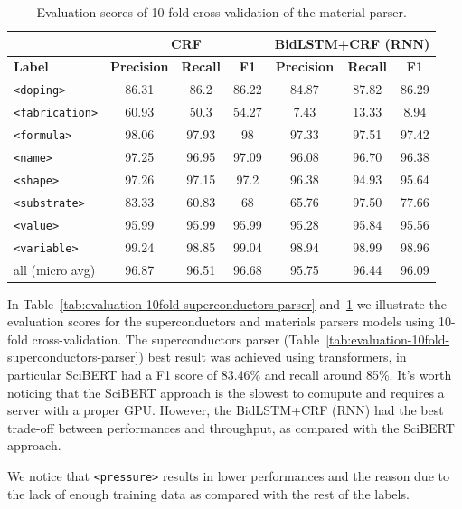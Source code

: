 \documentclass{article}
\begin{document}
\begin{table}[ht]
\centering
\begin{tabular}{l|ccc|ccc}
& \multicolumn{3}{c}{\textbf{CRF}} & \multicolumn{3}{c}{\textbf{BidLSTM+CRF} (RNN)}\\ 
\hline \textbf{Label} & \textbf{Precision} & \textbf{Recall} & \textbf{F1} & \textbf{Precision} & \textbf{Recall} & \textbf{F1} \\ \hline

\texttt{<doping>}      & 86.31   & 86.2     & 86.22 & 84.87 &  87.82 & 86.29   \\
\texttt{<fabrication>} & 60.93   & 50.3     & 54.27 & 7.43  &  13.33 & 8.94   \\
\texttt{<formula>}     & 98.06   & 97.93    & 98    & 97.33 &  97.51 & 97.42  \\
\texttt{<name>}        & 97.25   & 96.95    & 97.09 & 96.08 &  96.70 & 96.38  \\
\texttt{<shape>}       & 97.26   & 97.15    & 97.2  & 96.38 &  94.93 & 95.64  \\
\texttt{<substrate>}   & 83.33   & 60.83    & 68    & 65.76 &  97.50 & 77.66  \\
\texttt{<value>}       & 95.99   & 95.99    & 95.99 & 95.28 &  95.84 & 95.56  \\
\texttt{<variable>}    & 99.24   & 98.85    & 99.04 & 98.94 &  98.99 & 98.96  \\
\hline
all  (micro avg)       & 96.87   & 96.51    & 96.68  & 95.75 &   96.44  &  96.09  \\
\hline
\end{tabular}
\caption{Evaluation scores of 10-fold cross-validation of the material parser. }
\label{tab:evaluation-10fold-material-parser}
\end{table}

In Table~\ref{tab:evaluation-10fold-superconductors-parser} and~\ref{tab:evaluation-10fold-material-parser} we illustrate the evaluation scores for the superconductors and materials parsers models using 10-fold cross-validation. 
The superconductors parser (Table~\ref{tab:evaluation-10fold-superconductors-parser}) best result was achieved using transformers, in particular SciBERT had a F1 score of 83.46\% and recall around 85\%. It's worth noticing that the SciBERT approach is the slowest to comupute and requires a server with a proper GPU.
However, the BidLSTM+CRF (RNN) had the best trade-off between performances and throughput, as compared with the SciBERT approach. 

We notice that \texttt{<pressure>} results in lower performances and the reason due to the lack of enough training data as compared with the rest of the labels. 
\end{document}
